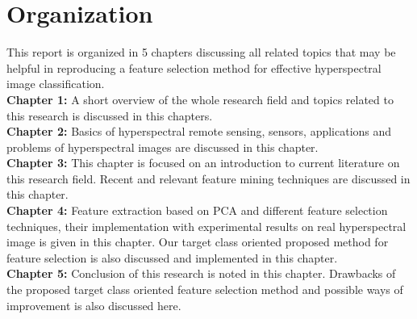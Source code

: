 \documentclass[document.tex]{subfiles}
\begin{document}
\section{Organization}
\noindent This report is organized in 5 chapters discussing all related topics that may be helpful in reproducing a feature selection method for effective hyperspectral image classification.\\
\textbf{Chapter 1: } A short overview of the whole research field and topics related to this research is discussed in this chapters.\\
\textbf{Chapter 2: } Basics of hyperspectral remote sensing, sensors, applications and problems of hyperspectral images are discussed in this chapter. \\
\textbf{Chapter 3: } This chapter is focused on an introduction to current literature on this research field. Recent and relevant feature mining techniques are discussed in this chapter.\\
\textbf{Chapter 4: } Feature extraction based on PCA and different feature selection techniques, their implementation with experimental results on real hyperspectral image is given in this chapter. Our target class oriented proposed method for feature selection is also discussed and implemented in this chapter.\\ 
\textbf{Chapter 5: } Conclusion of this research is noted in this chapter. Drawbacks of the proposed target class oriented feature selection method and possible ways of improvement is also discussed here.\\
 
\end{document}
